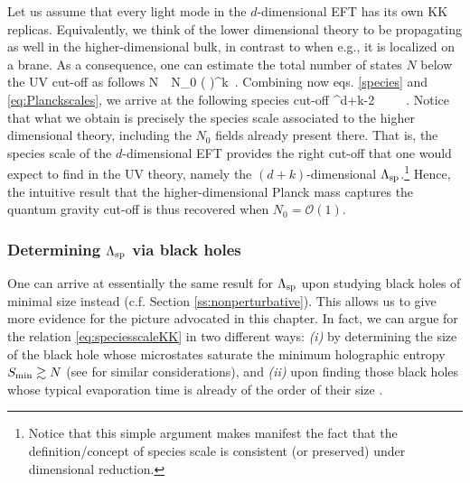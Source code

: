 Let us assume that every light mode in the $d$-dimensional EFT has its own KK replicas. Equivalently, we think of the lower dimensional theory to be propagating as well in the higher-dimensional bulk, in contrast to when e.g., it is localized on a brane. As a consequence, one can estimate the total number of states $N$ below the UV cut-off as follows
%
\beq
	N\, \simeq\, N_0 \left( \frac{\LSP}{\MKK} \right)^{k}\, .
	\label{eq:numberKKmodes}
\eeq
%
Combining now eqs. \eqref{species} and \eqref{eq:Planckscales}, we arrive at the following species cut-off
%
\beq\label{eq:speciesscaleKK}
	\LSP^{d+k-2}\, \simeq\, \, \simeq\, \, .
\eeq
%
Notice that what we obtain is precisely the species scale associated to the higher dimensional theory, including the $N_0$ fields already present there. That is, the species scale of the $d$-dimensional EFT provides the right cut-off that one would expect to find in the UV theory, namely the $(d+k)$-dimensional $\Lambda_{\text{sp}}$.\footnote{Notice that this simple argument makes manifest the fact that the definition/concept of species scale is consistent (or preserved) under dimensional reduction.} %
Hence, the intuitive result that the higher-dimensional Planck mass captures the quantum gravity cut-off is thus recovered when $N_0=\mathcal{O}(1)$.

\subsubsection*{Determining $\Lambda_{\text{sp}}$ via black holes}

One can arrive at essentially the same result for $\Lambda_{\text{sp}}$ upon studying black holes of minimal size instead (c.f. Section \ref{ss:nonperturbative}). This allows us to give more evidence for the picture advocated in this chapter. In fact, we can argue for the relation \eqref{eq:speciesscaleKK} in two different ways: \emph{(i)} by determining the size of the black hole whose microstates saturate the minimum holographic entropy $S_{\rm min} \gtrsim N$ (see \cite{Blumenhagen:2023yws, Calderon-Infante:2023uhz} for similar considerations), and \emph{(ii)} upon finding those black holes whose typical evaporation time is already of the order of their size \cite{BHdecaynotes}. 

